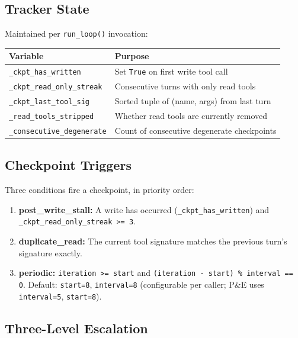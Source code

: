 \documentclass[11pt,letterpaper]{report}
\newcommand{\code}[1]{\texttt{#1}}
\begin{document}
\subsection{Tracker State}

Maintained per \code{run\_loop()} invocation:

\begin{table}[h]
\centering
\begin{tabular}{@{}ll@{}}
\toprule
Variable & Purpose \\
\midrule
\code{\_ckpt\_has\_written} & Set \code{True} on first write tool call \\
\code{\_ckpt\_read\_only\_streak} & Consecutive turns with only read tools \\
\code{\_ckpt\_last\_tool\_sig} & Sorted tuple of (name, args) from last turn \\
\code{\_read\_tools\_stripped} & Whether read tools are currently removed \\
\code{\_consecutive\_degenerate} & Count of consecutive degenerate checkpoints \\
\bottomrule
\end{tabular}
\end{table}

\subsection{Checkpoint Triggers}

Three conditions fire a checkpoint, in priority order:

\begin{enumerate}[nosep]
  \item \textbf{post\_write\_stall:} A write has occurred
        (\code{\_ckpt\_has\_written}) and
        \code{\_ckpt\_read\_only\_streak >= 3}.
  \item \textbf{duplicate\_read:} The current tool signature matches
        the previous turn's signature exactly.
  \item \textbf{periodic:} \code{iteration >= start} and
        \code{(iteration - start) \% interval == 0}. Default:
        \code{start=8}, \code{interval=8} (configurable per caller;
        P\&E uses \code{interval=5}, \code{start=8}).
\end{enumerate}

\subsection{Three-Level Escalation}
\end{document}

